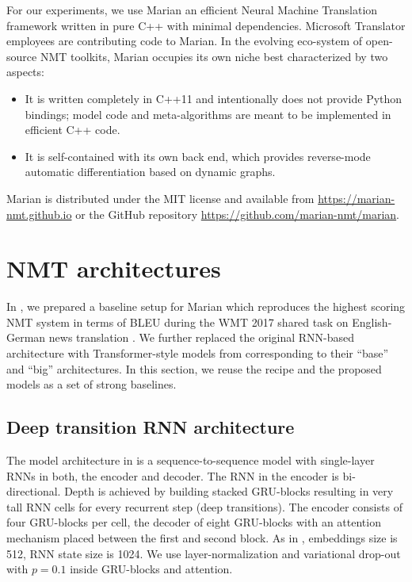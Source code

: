 \documentclass[11pt,a4paper]{article}
\begin{document}
For our experiments, we use Marian \cite{marian} an efficient Neural Machine Translation framework written in pure C++ with minimal dependencies.  Microsoft Translator employees are contributing code to Marian. In the evolving eco-system of open-source NMT toolkits, Marian occupies its own niche best characterized by two aspects:
  \begin{itemize}
  \item It is written completely in C++11 and intentionally does not provide Python bindings; model code and meta-algorithms are meant to be implemented in efficient C++ code.
  \item It is self-contained with its own back end, which provides reverse-mode automatic differentiation based on dynamic graphs.
  \end{itemize}

Marian is distributed under the MIT license and available from \url{https://marian-nmt.github.io} or the GitHub repository \url{https://github.com/marian-nmt/marian}.


\section{NMT architectures}

In , we prepared a baseline setup for Marian which reproduces the highest scoring NMT system \cite{DBLP:conf/wmt/SennrichBCGHHBW17} in terms of BLEU during the WMT 2017 shared task on English-German news translation \cite{DBLP:conf/wmt/2017}. We further replaced the original RNN-based architecture with  Transformer-style models from  corresponding to their ``base'' and ``big'' architectures. In this section, we reuse the recipe and the proposed models as a set of strong baselines. 

\subsection{Deep transition RNN architecture}

  The model architecture in  is a sequence-to-sequence model with single-layer RNNs in both, the encoder and decoder. The RNN in the encoder is bi-directional. Depth is achieved by building stacked GRU-blocks resulting in very tall RNN cells for every recurrent step (deep transitions). The encoder consists of four GRU-blocks per cell, the decoder of eight GRU-blocks with an attention mechanism placed between the first and second block. As in , embeddings size is 512, RNN state size is 1024. We use layer-normalization \cite{ba2016layer} and variational drop-out with $p=0.1$ \cite{gal2016theoretically} inside GRU-blocks and attention.
\end{document}
